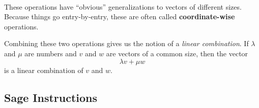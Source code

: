 \documentclass[10pt,]{book}
\newcommand{\terminology}[1]{\textbf{#1}}
\theoremstyle{plain}
\numberwithin{equation}{section}
\begin{document}
\paragraph[]{}\label{paragraph-3}
These operations have ``obvious'' generalizations to vectors of different sizes. Because things go entry-by-entry, these are often called \terminology{coordinate-wise} operations.%
\par
Combining these two operations gives us the notion of a \emph{linear combination}. If \(\lambda\) and \(\mu\) are numbers and \(v\) and \(w\) are vectors of a common size, then the vector \[\lambda v + \mu w \] is a linear combination of \(v\) and \(w\).%
\typeout{************************************************}
\typeout{************************************************}
\subsection[Sage Instructions]{Sage Instructions}\label{subsection-4}
\typeout{************************************************}
\typeout{************************************************}
\end{document}
